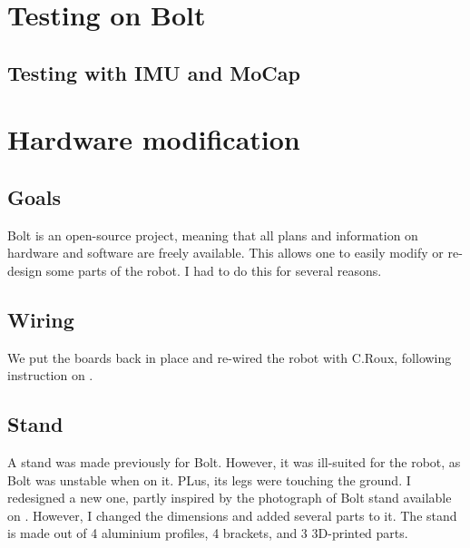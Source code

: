 \documentclass[a4paper,10pt]{article}
\begin{document}
\section{Testing on Bolt}


\subsection{Testing with IMU and MoCap}

\section{Hardware modification}
\subsection{Goals}
Bolt is an open-source project, meaning that all plans and information on hardware and software are freely available. This allows one to easily modify or re-design some parts of the robot. I had to do this for several reasons.

\subsection{Wiring}
We put the boards back in place and re-wired the robot with C.Roux, following instruction on \cite{2}.

\subsection{Stand}
A stand was made previously for Bolt. However, it was ill-suited for the robot, as Bolt was unstable when on it. PLus, its legs were touching the ground. I redesigned a new one, partly inspired by the photograph of Bolt stand available on \cite{2}. However, I changed the dimensions and added several parts to it. The stand is made out of 4 aluminium profiles, 4 brackets, and 3 3D-printed parts.
\end{document}

